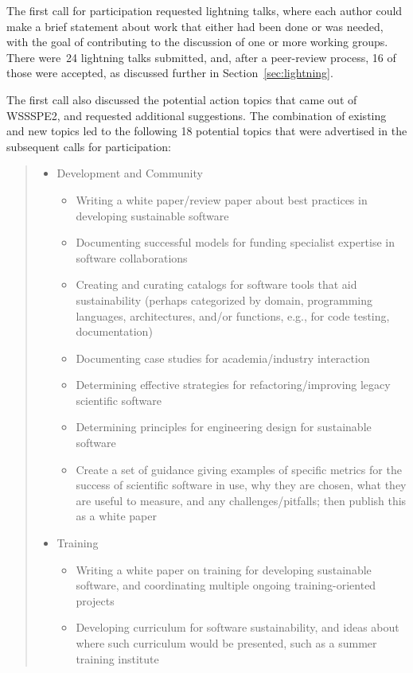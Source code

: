 \documentclass[11pt, oneside]{amsart}
\begin{document}
The first call for participation requested lightning talks, where each author
could make a brief statement about work that either had been done or was needed,
with the goal of contributing to the discussion of one or more working groups.
There were~24 lightning talks submitted, and, after a peer-review process, 16 of
those were accepted, as discussed further in Section~\ref{sec:lightning}.

The first call also discussed the potential action topics that came out of
WSSSPE2, and requested additional suggestions. The combination of existing and
new topics led to the following 18 potential topics that were advertised in the
subsequent calls for participation:


\begin{quote}
\begin{itemize}
\renewcommand{\labelenumi}{\textbf{\theenumi}.}
\setlength{\rightmargin}{1em}

\item Development and Community
\begin{itemize}
\item Writing a white paper/review paper about best practices in developing
sustainable software
\item Documenting successful models for funding specialist expertise in software
collaborations
\item Creating and curating catalogs for software tools that aid sustainability
(perhaps categorized by domain, programming languages, architectures, and/or
functions, e.g., for code testing, documentation)
\item Documenting case studies for academia/industry interaction
\item Determining effective strategies for refactoring/improving legacy
scientific software
\item Determining principles for engineering design for sustainable software
\item Create a set of guidance giving examples of specific metrics for the
success of scientific software in use, why they are chosen, what they are
useful to measure, and any challenges/pitfalls; then publish this as a white
paper
\end{itemize}

\item Training
\begin{itemize}
\item Writing a white paper on training for developing sustainable software, and
coordinating multiple ongoing training-oriented projects
\item Developing curriculum for software sustainability, and ideas about where
such curriculum would be presented, such as a summer training institute
\end{itemize}


\end{itemize}
\end{quote}
\end{document}
